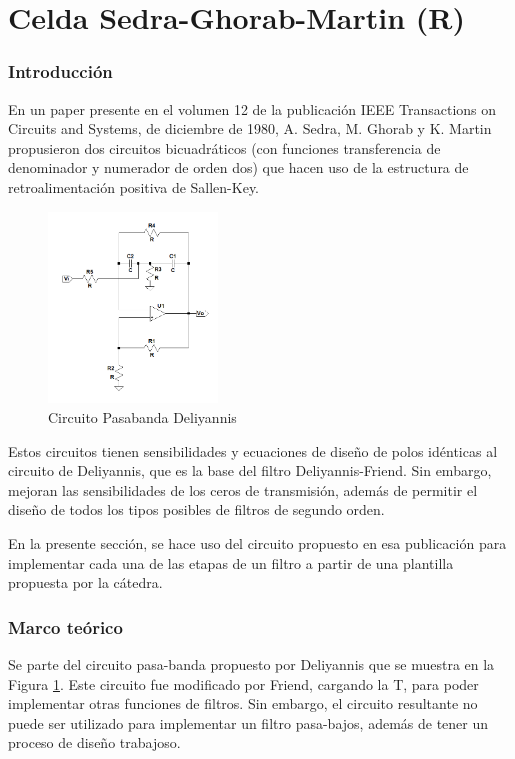 \documentclass[spanish]{article}
\begin{document}
\part{Celda Sedra-Ghorab-Martin (R)}

\section{Introducción}
En un paper presente en el volumen 12 de la publicación IEEE Transactions on Circuits and Systems, de diciembre de 1980, A. Sedra, M. Ghorab y K. Martin propusieron dos circuitos bicuadráticos (con funciones transferencia de denominador y numerador de orden dos) que hacen uso de la estructura de retroalimentación positiva de Sallen-Key. 

\begin{figure}[H]
\begin{centering}
\includegraphics[width=0.4\textwidth]{Resources/Deliyannis}
\par\end{centering}
\caption{Circuito Pasabanda Deliyannis}
\label{3_1}
\end{figure}

Estos circuitos tienen sensibilidades y ecuaciones de diseño de polos idénticas al circuito de Deliyannis, que es la base del filtro Deliyannis-Friend. Sin embargo, mejoran las sensibilidades de los ceros de transmisión, además de permitir el diseño de todos los tipos posibles de filtros de segundo orden.

En la presente sección, se hace uso del circuito propuesto en esa publicación para implementar cada una de las etapas de un filtro a partir de una plantilla propuesta por la cátedra.

\section{Marco teórico} \label{marcoteorico}
Se parte del circuito pasa-banda propuesto por Deliyannis que se muestra en la
Figura \ref{3_1}. Este circuito fue modificado por Friend, cargando la T, para poder implementar otras funciones de filtros. Sin embargo, el circuito resultante no puede ser utilizado para implementar un filtro pasa-bajos, además de tener un proceso de diseño trabajoso.
\end{document}
